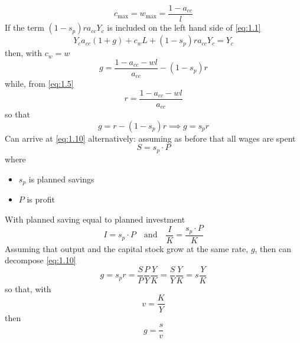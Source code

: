 \documentclass[a4paper,twoside]{article}
\numberwithin{equation}{section}
\numberwithin{figure}{section}
\begin{document}
	\begin{equation}
		c_{\max} = w_{\max} = \frac{1-a_{cc}}{l} \label{eq:1.9}
	\end{equation}
	If the term \( (1-s_p)ra_{cc}Y_c \) is included on the left hand side of \cref{eq:1.1}
	\[
		Y_c a_{cc} (1+g) + c_w L + (1-s_p)ra_{cc}Y_c = Y_c
	\]
	then, with \( c_w = w \)
	\[
		g = \frac{1-a_{cc}-wl}{a_{cc}}-(1-s_p)r
	\]
	while, from \cref{eq:1.5}
	\[
		r = \frac{1-a_{cc}-wl}{a_{cc}}
	\]
	so that
	\begin{equation}
		g = r-(1-s_p)r \implies g = s_p r \label{eq:1.10}
	\end{equation}
	Can arrive at \cref{eq:1.10} alternatively: assuming as before that all wages are spent
	\begin{equation}
		S = s_p \cdot P \label{eq:1.11}
	\end{equation}
	where
	\begin{itemize}
		\item \( s_p \) is planned savings
		\item \( P \) is profit
	\end{itemize}
	With planned saving equal to planned investment
	\begin{equation}
		I = s_p \cdot P \quad\text{and}\quad \frac{I}{K} = \frac{s_p \cdot P}{K} \label{eq:1.12}
	\end{equation}
	Assuming that output and the capital stock grow at the same rate, \( g \), then can decompose \cref{eq:1.10}
	\begin{equation}
		g = s_p r = \frac{S}{P}\frac{P}{Y}\frac{Y}{K} = \frac{S}{Y}\frac{Y}{K} = s \frac{Y}{K} \label{eq:1.13}
	\end{equation}
	so that, with
	\begin{equation}
		v = \frac{K}{Y} \label{eq:1.14}
	\end{equation}
	then
	\begin{equation}
		g = \frac{s}{v}
	\end{equation}
\end{document}
